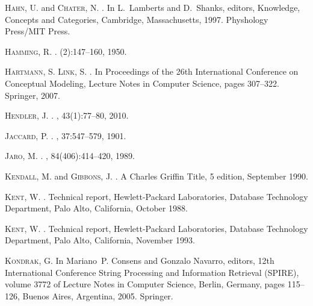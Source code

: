 \documentclass[a4paper,10pt,twoside]{article}
\theoremstyle{definition}
\begin{document}
\begin{thebibliography}{10}
\textsc{Hahn}, U. and \textsc{Chater}, N.
.
\newblock In L.~Lamberts and D.~Shanks, editors, Knowledge, Concepts and
    Categories, Cambridge, Massachusetts, 1997. Physhology Press/MIT Press.

\textsc{Hamming}, R.
.
(2):147--160, 1950.

\textsc{Hartmann}, S. \textsc{Link}, S.
.
\newblock In Proceedings of the 26th International Conference on
    Conceptual Modeling, {Lecture Notes in Computer Science}, pages 307--322.
    Springer, 2007.

\textsc{Hendler}, J.
.
, 43(1):77--80, 2010.

\textsc{Jaccard}, P.
.
, 37:547--579, 1901.

\textsc{Jaro, M.}
.
,
    84(406):414--420, 1989.

\textsc{Kendall}, M. and \textsc{Gibbons}, J.
.
\newblock A Charles Griffin Title, 5 edition, September 1990.

\textsc{Kent}, W.
.
\newblock Technical report, Hewlett-Packard Laboratories, Database Technology
    Department, Palo Alto, California, October 1988.

\textsc{Kent}, W.
.
\newblock Technical report, Hewlett-Packard Laboratories, Database Technology
    Department, Palo Alto, California, November 1993.

\textsc{Kondrak}, G.
\newblock In Mariano~P. Consens and Gonzalo Navarro, editors, {{12th
    International Conference String Processing and Information Retrieval
    (SPIRE)}}, volume 3772 of {{Lecture Notes in Computer Science, Berlin,
    Germany}}, pages 115--126, Buenos Aires, Argentina, 2005. Springer.


\end{thebibliography}
\end{document}
